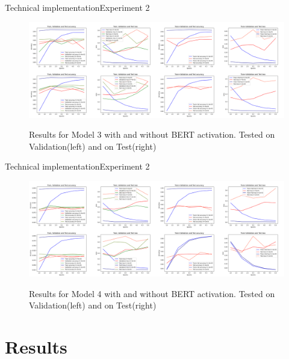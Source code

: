 \documentclass[
]{beamer}
\begin{document}
\begin{frame}{Technical implementation}{Experiment 2}

\begin{center}
    \begin{figure}[!h]
        \centering
        \includegraphics[width=\textwidth]{img/ger_model2.png}
        \label{fig:ger_model2}
        \caption{Results for Model 3 with and without BERT activation. Tested on Validation(left) and on Test(right)}
    \end{figure}
\end{center}

\end{frame}


\begin{frame}{Technical implementation}{Experiment 2}

\begin{center}
    \begin{figure}[!h]
        \centering
        \includegraphics[width=\textwidth]{img/ger_model3.png}
        \label{fig:ger_model3}
        \caption{Results for Model 4 with and without BERT activation. Tested on Validation(left) and on Test(right)}
    \end{figure}
\end{center}

\end{frame}



\section[Results]{Results}
\end{document}
